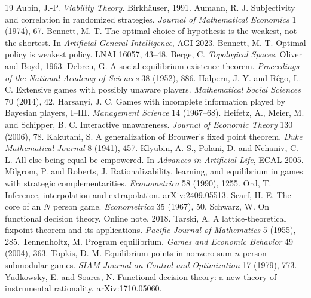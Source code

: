 \documentclass[11pt]{article}
\theoremstyle{definition}
\begin{document}
\begin{thebibliography}{19}
 Aubin, J.-P. \emph{Viability Theory}. Birkh\"auser, 1991.
 Aumann, R. J. Subjectivity and correlation in randomized strategies. \emph{Journal of Mathematical Economics} 1 (1974), 67.
 Bennett, M. T. The optimal choice of hypothesis is the weakest, not the shortest. In \emph{Artificial General Intelligence}, AGI 2023.
 Bennett, M. T. Optimal policy is weakest policy. LNAI 16057, 43--48.
 Berge, C. \emph{Topological Spaces}. Oliver and Boyd, 1963.
 Debreu, G. A social equilibrium existence theorem. \emph{Proceedings of the National Academy of Sciences} 38 (1952), 886.
 Halpern, J. Y. and R\^ego, L. C. Extensive games with possibly unaware players. \emph{Mathematical Social Sciences} 70 (2014), 42.
 Harsanyi, J. C. Games with incomplete information played by Bayesian players, I--III. \emph{Management Science} 14 (1967--68).
 Heifetz, A., Meier, M. and Schipper, B. C. Interactive unawareness. \emph{Journal of Economic Theory} 130 (2006), 78.
 Kakutani, S. A generalization of Brouwer's fixed point theorem. \emph{Duke Mathematical Journal} 8 (1941), 457.
 Klyubin, A. S., Polani, D. and Nehaniv, C. L. All else being equal be empowered. In \emph{Advances in Artificial Life}, ECAL 2005.
 Milgrom, P. and Roberts, J. Rationalizability, learning, and equilibrium in games with strategic complementarities. \emph{Econometrica} 58 (1990), 1255.
 Ord, T. Inference, interpolation and extrapolation. arXiv:2409.05513.
 Scarf, H. E. The core of an $N$ person game. \emph{Econometrica} 35 (1967), 50.
 Schwarz, W. On functional decision theory. Online note, 2018.
 Tarski, A. A lattice-theoretical fixpoint theorem and its applications. \emph{Pacific Journal of Mathematics} 5 (1955), 285.
 Tennenholtz, M. Program equilibrium. \emph{Games and Economic Behavior} 49 (2004), 363.
 Topkis, D. M. Equilibrium points in nonzero-sum $n$-person submodular games. \emph{SIAM Journal on Control and Optimization} 17 (1979), 773.
 Yudkowsky, E. and Soares, N. Functional decision theory: a new theory of instrumental rationality. arXiv:1710.05060.
\end{thebibliography}
\end{document}

